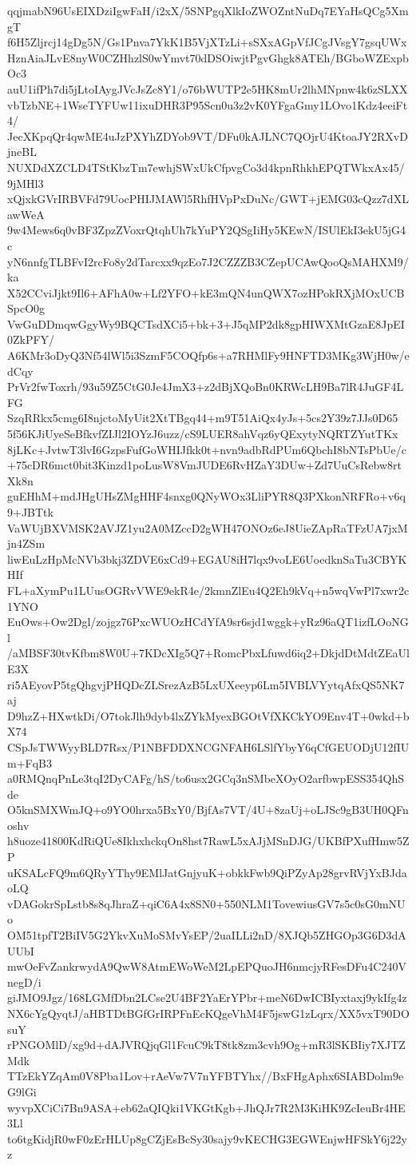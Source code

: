 qqjmabN96UsEIXDziIgwFaH/i2xX/5SNPgqXlkIoZWOZntNuDq7EYaHsQCg5XmgT
f6H5Zljrcj14gDg5N/Gs1Pnva7YkK1B5VjXTzLi+sSXxAGpVfJCgJVsgY7gsqUWx
HznAiaJLvE8nyW0CZHhzlS0wYmvt70dDSOiwjtPgvGhgk8ATEh/BGboWZExpbOc3
auU1ifPh7di5jLtoIAygJVcJsZc8Y1/o76bWUTP2e5HK8mUr2lhMNpnw4k6zSLXX
vbTzbNE+1WseTYFUw11ixuDHR3P95Scn0u3z2vK0YFgaGmy1LOvo1Kdz4eeiFt4/
JecXKpqQr4qwME4uJzPXYhZDYob9VT/DFu0kAJLNC7QOjrU4KtoaJY2RXvDjneBL
NUXDdXZCLD4TStKbzTm7ewhjSWxUkCfpvgCo3d4kpnRhkhEPQTWkxAx45/9jMHl3
xQjxkGVrIRBVFd79UocPHIJMAWl5RhfHVpPxDuNc/GWT+jEMG03cQzz7dXLawWeA
9w4Mews6q0vBF3ZpzZVoxrQtqhUh7kYuPY2QSgIiHy5KEwN/ISUlEkI3ekU5jG4c
yN6nnfgTLBFvI2rcFo8y2dTarcxx9qzEo7J2CZZZB3CZepUCAwQooQsMAHXM9/ka
X52CCviJjkt9Il6+AFhA0w+Lf2YFO+kE3mQN4unQWX7ozHPokRXjMOxUCBSpcO0g
VwGuDDmqwGgyWy9BQCTsdXCi5+bk+3+J5qMP2dk8gpHIWXMtGzaE8JpEI0ZkPFY/
A6KMr3oDyQ3Nf54lWl5i3SzmF5COQfp6s+a7RHMlFy9HNFTD3MKg3WjH0w/edCqy
PrVr2fwToxrh/93u59Z5CtG0Je4JmX3+z2dBjXQoBn0KRWcLH9Ba7lR4JuGF4LFG
SzqRRkx5cmg6I8njctoMyUit2XtTBgq44+m9T51AiQx4yJs+5cs2Y39z7JJs0D65
5f56KJiUyeSeBfkvfZIJl2IOYzJ6uzz/cS9LUER8ahVqz6yQExytyNQRTZYutTKx
8jLKc+JvtwT3lvI6GzpsFufGoWHIJfkk0t+nvn9adbRdPUm6QbchI8bNTsPbUe/c
+75cDR6mct0bit3Kinzd1poLusW8VmJUDE6RvHZaY3DUw+Zd7UuCsRebw8rtXk8n
guEHhM+mdJHgUHsZMgHHF4snxg0QNyWOx3LliPYR8Q3PXkonNRFRo+v6q9+JBTtk
VaWUjBXVMSK2AVJZ1yu2A0MZccD2gWH47ONOz6eJ8UieZApRaTFzUA7jxMjn4ZSm
liwEuLzHpMcNVb3bkj3ZDVE6xCd9+EGAU8iH7lqx9voLE6UoedknSaTu3CBYKHIf
FL+aXymPu1LUusOGRvVWE9ekR4e/2kmnZlEu4Q2Eh9kVq+n5wqVwPl7xwr2c1YNO
EuOws+Ow2Dgl/zojgz76PxcWUOzHCdYfA9sr6sjd1wggk+yRz96aQT1izfLOoNGl
/aMBSF30tvKfbm8W0U+7KDcXIg5Q7+RomcPbxLfuwd6iq2+DkjdDtMdtZEaUlE3X
ri5AEyovP5tgQhgvjPHQDcZLSrezAzB5LxUXeeyp6Lm5IVBLVYytqAfxQS5NK7aj
D9hzZ+HXwtkDi/O7tokJlh9dyb4lxZYkMyexBGOtVfXKCkYO9Env4T+0wkd+bX74
CSpJsTWWyyBLD7Rsx/P1NBFDDXNCGNFAH6LSlfYbyY6qCfGEUODjU12fIUm+FqB3
a0RMQnqPnLe3tqI2DyCAFg/hS/to6usx2GCq3nSMbeXOyO2arfbwpESS354QhSde
O5knSMXWmJQ+o9YO0hrxa5BxY0/BjfAs7VT/4U+8zaUj+oLJSc9gB3UH0QFnoshv
h8uoze41800KdRiQUe8IkhxhckqOn8hst7RawL5xAJjMSnDJG/UKBfPXufHmw5ZP
uKSALcFQ9m6QRyYThy9EMlJatGnjyuK+obkkFwb9QiPZyAp28grvRVjYxBJdaoLQ
vDAGokrSpLstb8s8qJhraZ+qiC6A4x8SN0+550NLM1TovewiusGV7s5c0sG0mNUo
OM51tpfT2BiIV5G2YkvXuMoSMvYsEP/2uaILLi2nD/8XJQb5ZHGOp3G6D3dAUUbI
mwOeFvZankrwydA9QwW8AtmEWoWeM2LpEPQuoJH6nmcjyRFesDFu4C240VnegD/i
giJMO9Jgz/168LGMfDbn2LCse2U4BF2YaErYPbr+meN6DwICBIyxtaxj9ykIfg4z
NX6cYgQyqtJ/aHBTDtBGfGrIRPFnEcKQgeVhM4F5jswG1zLqrx/XX5vxT90DOsuY
rPNGOMlD/xg9d+dAJVRQjqGl1FcuC9kT8tk8zm3cvh9Og+mR3lSKBIiy7XJTZMdk
TTzEkYZqAm0V8Pba1Lov+rAeVw7V7nYFBTYhx//BxFHgAphx6SIABDolm9eG9lGi
wyvpXCiCi7Bn9ASA+eb62aQIQki1VKGtKgb+JhQJr7R2M3KiHK9ZcIeuBr4HE3Ll
to6tgKidjR0wF0zErHLUp8gCZjEsBcSy30sajy9vKECHG3EGWEnjwHFSkY6j22yz
